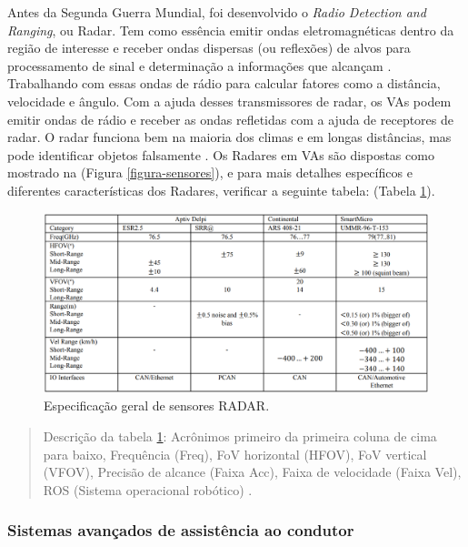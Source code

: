 


Antes da Segunda Guerra Mundial, foi desenvolvido o \textit{Radio Detection and Ranging}, ou Radar. Tem como essência emitir ondas eletromagnéticas dentro da região de interesse e receber ondas dispersas (ou reflexões) de alvos para processamento de sinal e determinação a informações que alcançam \cite{sensors}. Trabalhando com essas ondas de rádio para calcular fatores como a distância, velocidade e ângulo. Com a ajuda desses transmissores de radar, os VAs podem emitir ondas de rádio e receber as ondas refletidas com a ajuda de receptores de radar. O radar funciona bem na maioria dos climas e em longas distâncias, mas pode identificar objetos falsamente \cite{review-auto}.
Os Radares em VAs são dispostas como mostrado na (Figura \ref{figura-sensores}), e para mais detalhes específicos e diferentes características dos Radares, verificar a seguinte tabela: (Tabela \ref{tabela-radar}).



\begin{figure}[H]
\centering
\includegraphics[width=\textwidth]{Figures/radar-table.png}
\caption{Especificação geral de sensores RADAR.}
\label{tabela-radar}
\end{figure}

\begin{quote}

Descrição da tabela \ref{tabela-radar}:  Acrônimos primeiro da primeira coluna de cima para baixo, Frequência (Freq), FoV horizontal (HFOV), FoV vertical (VFOV), Precisão de alcance (Faixa Acc), Faixa de velocidade (Faixa Vel), ROS (Sistema operacional robótico) \cite{sensors}.
\end{quote}


\subsubsection{Sistemas avançados de assistência ao condutor}


